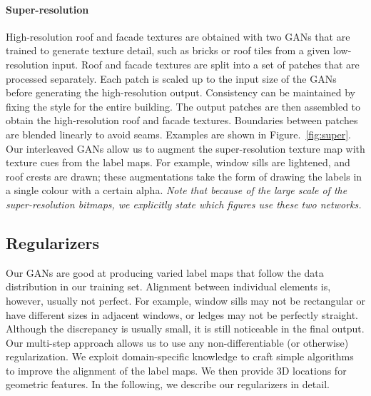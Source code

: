 \paragraph{Super-resolution}
High-resolution roof and facade textures are obtained with two GANs that are trained to generate texture detail, such as bricks or roof tiles from a given low-resolution input. Roof and facade textures are split into a set of patches that are processed separately. Each patch is scaled up to the input size of the GANs before generating the high-resolution output. Consistency can be maintained by fixing the style for the entire building. The output patches are then assembled to obtain the high-resolution roof and facade textures. Boundaries between patches are blended linearly to avoid seams. Examples are shown in Figure.~\ref{fig:super}. Our interleaved GANs allow us to augment the super-resolution texture map with texture cues from the label maps. For example, window sills are lightened, and roof crests are drawn; these augmentations take the form of drawing the labels in a single colour with a certain alpha. 
\emph{Note that because of the large scale of the super-resolution bitmaps, we explicitly state which figures use these two networks.}


\subsection{Regularizers}
\label{sec:regularizers}
Our GANs are good at producing varied label maps that follow the data distribution in our training set. Alignment between individual elements is, however, usually not perfect. For example, window sills may not be rectangular or have different sizes in adjacent windows, or ledges may not be perfectly straight. Although the discrepancy is usually small, it is still noticeable in the final output. Our multi-step approach allows us to use any non-differentiable (or otherwise) regularization. We exploit domain-specific knowledge to craft simple algorithms to improve the alignment of the label maps. We then provide 3D locations for geometric features. In the following, we describe our regularizers in detail.


